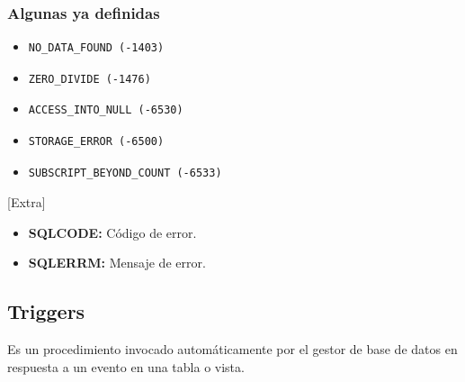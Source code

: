 \documentclass{templateNote}
\begin{document}
\subsubsection{Algunas ya definidas}
\begin{itemize}
    \item \begin{verbatim}NO_DATA_FOUND (-1403)\end{verbatim}
    \item \begin{verbatim}ZERO_DIVIDE (-1476)\end{verbatim}
    \item \begin{verbatim}ACCESS_INTO_NULL (-6530)\end{verbatim}
    \item \begin{verbatim}STORAGE_ERROR (-6500)\end{verbatim}
    \item \begin{verbatim}SUBSCRIPT_BEYOND_COUNT (-6533)\end{verbatim}
\end{itemize}


[Extra]
\begin{itemize}
    \item \textbf{SQLCODE:} Código de error.
    \item \textbf{SQLERRM:} Mensaje de error.
\end{itemize}

\newpage
\subsection{Triggers}
Es un procedimiento invocado autom\'aticamente por el gestor de base de datos en respuesta a un evento en una tabla o vista.
\end{document}
